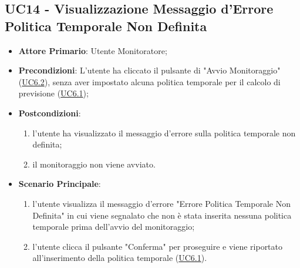 
		\label{par:UC14}
	\subsection{UC14 - Visualizzazione Messaggio d'Errore Politica Temporale Non Definita}
		\begin{itemize}
			\item\textbf{Attore Primario}: Utente Monitoratore;
			\item\textbf{Precondizioni}: L’utente ha cliccato il pulsante di "Avvio Monitoraggio" (\hyperref[par:UC6.2]{UC6.2}), senza aver impostato alcuna politica temporale per il calcolo di previsione  (\hyperref[par:UC6.1]{UC6.1});
			\item\textbf{Postcondizioni}:
				\begin{enumerate} 
					\item l’utente ha visualizzato il messaggio d'errore sulla politica temporale non definita;		
					\item	il monitoraggio non viene avviato.
				\end{enumerate}
			\item\textbf{Scenario Principale}: 
				\begin{enumerate} 
					\item l’utente visualizza il messaggio d'errore "Errore Politica Temporale Non Definita" in cui viene segnalato che non è stata inserita nessuna politica temporale prima dell'avvio del monitoraggio; 
					\item l'utente clicca il pulsante "Conferma" per proseguire e viene riportato all'inserimento della politica temporale (\hyperref[par:UC6.1]{UC6.1}).		
				\end{enumerate}		
		\end{itemize}

	
		\label{par:UC15}
